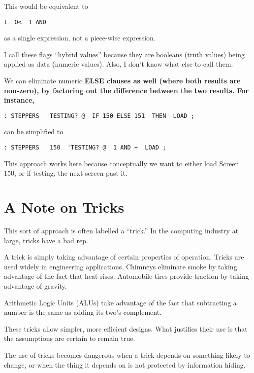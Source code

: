 This would be equivalent to

\begin{verbatim}
t  O<  1 AND
\end{verbatim}

as a single expression, not a piece-wise expression.

I call these flags ``hybrid values'' because they are booleans (truth
values) being applied as data (numeric values). Also, I don't know what
else to call them.

We can eliminate numeric \bf{ELSE} clauses as well (where both results
are non-zero), by factoring out the difference between the two results. For
instance,

\begin{verbatim}
: STEPPERS  'TESTING? @  IF 150 ELSE 151  THEN  LOAD ;
\end{verbatim}

can be simplified to

\begin{verbatim}
: STEPPERS   150  'TESTING? @  1 AND +  LOAD ;
\end{verbatim}

This approach works here because conceptually we want to either load
Screen 150, or if testing, the next screen past it.

\section{A Note on Tricks}

This sort of approach is often labelled a ``trick.'' In the computing
industry at large, tricks have a bad rep.

A trick is simply taking advantage of certain properties of operation.
Tricks are used widely in engineering applications. Chimneys
eliminate smoke by taking advantage of the fact that heat rises.
Automobile tires provide traction by taking advantage of gravity.

Arithmetic Logic Units (ALUs) take advantage of the fact that
subtracting a number is the same as adding its two's complement.

These tricks allow simpler, more efficient designs. What justifies
their use is that the assumptions are certain to remain true.

The use of tricks becomes dangerous when a trick depends on something
likely to change, or when the thing it depends on is not protected by
information hiding.

